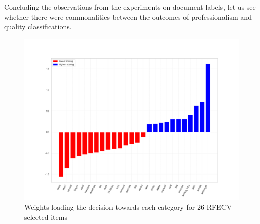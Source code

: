 Concluding the observations from the experiments on document labels, let us see whether there were commonalities between the outcomes of professionalism and quality classifications. 

\begin{figure}[H]
	\centering
	\includegraphics[width=.80\linewidth]{figures/bad-good-bars-ud26}
	\caption{\label{fig:qua-weights}Weights loading the decision towards each category for 26 RFECV-selected items}	
\end{figure}

